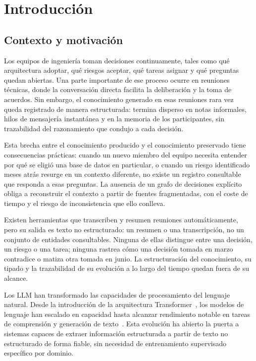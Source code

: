 \chapter{Introducción}

\section{Contexto y motivación}

Los equipos de ingeniería toman decisiones continuamente, tales como qué arquitectura adoptar, qué
riesgos aceptar, qué tareas asignar y qué preguntas quedan abiertas. Una parte importante de ese
proceso ocurre en reuniones técnicas, donde la conversación directa facilita la deliberación y la
toma de acuerdos. Sin embargo, el conocimiento generado en esas reuniones rara vez queda
registrado de manera estructurada: termina disperso en notas informales, hilos de mensajería
instantánea y en la memoria de los participantes, sin trazabilidad del razonamiento que condujo
a cada decisión.

Esta brecha entre el conocimiento producido y el conocimiento preservado tiene consecuencias
prácticas: cuando un nuevo miembro del equipo necesita entender por qué se eligió una base de
datos en particular, o cuando un riesgo identificado meses atrás resurge en un contexto diferente,
no existe un registro consultable que responda a esas preguntas. La ausencia de un grafo de
decisiones explícito obliga a reconstruir el contexto a partir de fuentes fragmentadas, con el
coste de tiempo y el riesgo de inconsistencia que ello conlleva.

Existen herramientas que transcriben y resumen reuniones automáticamente, pero su salida es texto
no estructurado: un resumen o una transcripción, no un conjunto de entidades consultables. Ninguna
de ellas distingue entre una decisión, un riesgo o una tarea; ninguna rastrea cómo una decisión
tomada en marzo contradice o matiza otra tomada en junio. La estructuración del conocimiento, su
tipado y la trazabilidad de su evolución a lo largo del tiempo quedan fuera de su alcance.

Los \ac{LLM} han transformado las capacidades de procesamiento del lenguaje natural. Desde la
introducción de la arquitectura Transformer~\cite{vaswani2017attention}, los modelos de lenguaje
han escalado en capacidad hasta alcanzar rendimiento notable en tareas de comprensión y generación
de texto~\cite{brown2020gpt3}. Esta evolución ha abierto la puerta a sistemas capaces de extraer
información estructurada a partir de texto no estructurado de forma fiable, sin necesidad de
entrenamiento supervisado específico por dominio.

